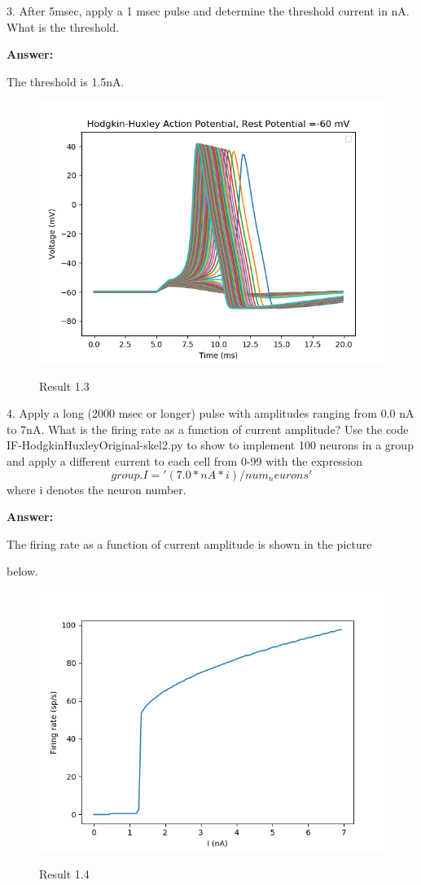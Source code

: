 \documentclass[12pt]{article}
\begin{document}
3. After	5msec,	apply	a	1	msec	pulse	and	determine	the	threshold	current	in	nA.
What	is	the	threshold.

\textbf{Answer:} 

\qquad The threshold is 1.5nA.

 \begin{figure}[H]
  \centering
  \includegraphics[width=.8\textwidth]{h1_p3.png} %
  \label{img} %
  \caption{Result 1.3}
\end{figure}

\newpage

4. Apply	a	long	(2000	msec or	longer) pulse	with	amplitudes	ranging	from	0.0	
nA	to	7nA.	What	is the	firing	rate	as	a	function	of	current	amplitude?	Use	the	
code IF-HodgkinHuxleyOriginal-skel2.py	to	show	to	implement	100	neurons	
in	a group	and	apply	a	different	current	to	each	cell	from	0-99	with	the	
expression
$$group.I	=	'(7.0*nA	*	i)	/	num_neurons'$$
where	i	denotes	the	neuron	number.

\textbf{Answer:} 

\qquad The firing rate as a function of current amplitude is shown in the picture 

below.

 \begin{figure}[H]
  \centering
  \includegraphics[width=.8\textwidth]{h1_p4.png} %
  \label{img} %
  \caption{Result 1.4}
\end{figure}
\end{document}
